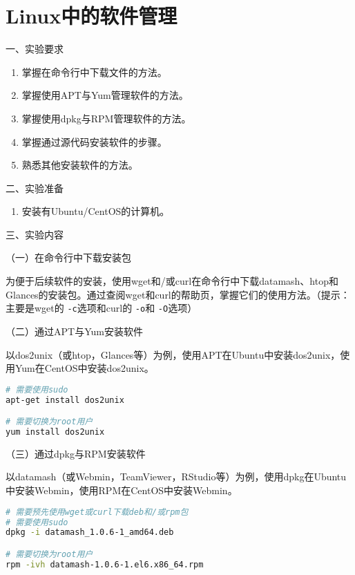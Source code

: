 \chapter{Linux中的软件管理}

\noindent
一、实验要求
\begin{enumerate}
  \item 掌握在命令行中下载文件的方法。
  \item 掌握使用APT与Yum管理软件的方法。
  \item 掌握使用dpkg与RPM管理软件的方法。
  \item 掌握通过源代码安装软件的步骤。
  \item 熟悉其他安装软件的方法。
\end{enumerate}

\vspace{0.2in}
\noindent
二、实验准备
\begin{enumerate}
  \item 安装有Ubuntu/CentOS的计算机。
\end{enumerate}

\vspace{0.2in}
\noindent
三、实验内容

\vspace{0.1in}
（一）在命令行中下载安装包

为便于后续软件的安装，使用wget和/或curl在命令行中下载datamash、htop和Glances的安装包。通过查阅wget和curl的帮助页，掌握它们的使用方法。（提示：主要是wget的
\verb|-c|选项和curl的 \verb|-o|和 \verb|-O|选项）

\vspace{0.1in}
（二）通过APT与Yum安装软件

以dos2unix（或htop，Glances等）为例，使用APT在Ubuntu中安装dos2unix，使用Yum在CentOS中安装dos2unix。
\begin{lstlisting}[language=bash]
# 需要使用sudo
apt-get install dos2unix

# 需要切换为root用户
yum install dos2unix
\end{lstlisting}

\vspace{0.1in}
（三）通过dpkg与RPM安装软件

以datamash（或Webmin，TeamViewer，RStudio等）为例，使用dpkg在Ubuntu中安装Webmin，使用RPM在CentOS中安装Webmin。
\begin{lstlisting}[language=bash]
# 需要预先使用wget或curl下载deb和/或rpm包
# 需要使用sudo
dpkg -i datamash_1.0.6-1_amd64.deb

# 需要切换为root用户
rpm -ivh datamash-1.0.6-1.el6.x86_64.rpm
\end{lstlisting}

